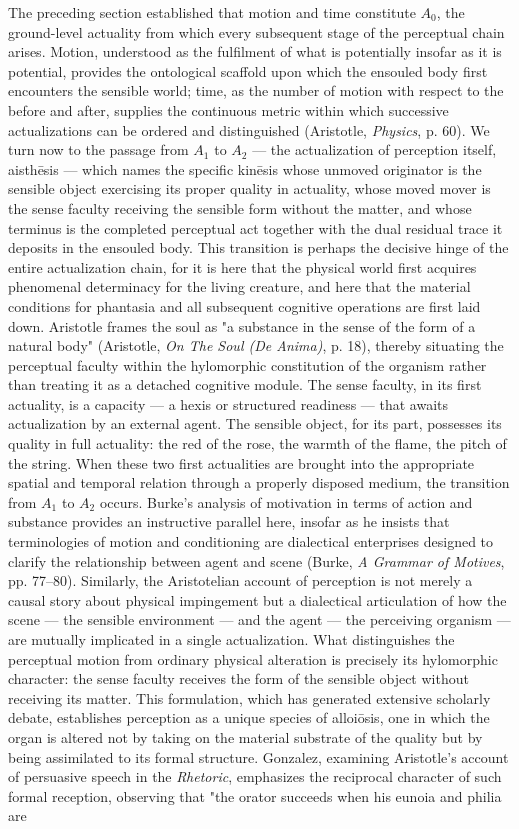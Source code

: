 The preceding section established that motion and time constitute $A_0$, the ground-level actuality from which every subsequent stage of the perceptual chain arises. Motion, understood as the fulfilment of what is potentially insofar as it is potential, provides the ontological scaffold upon which the ensouled body first encounters the sensible world; time, as the number of motion with respect to the before and after, supplies the continuous metric within which successive actualizations can be ordered and distinguished (Aristotle, \textit{Physics}, p. 60). We turn now to the passage from $A_1$ to $A_2$ --- the actualization of perception itself, aisthēsis --- which names the specific kinēsis whose unmoved originator is the sensible object exercising its proper quality in actuality, whose moved mover is the sense faculty receiving the sensible form without the matter, and whose terminus is the completed perceptual act together with the dual residual trace it deposits in the ensouled body. This transition is perhaps the decisive hinge of the entire actualization chain, for it is here that the physical world first acquires phenomenal determinacy for the living creature, and here that the material conditions for phantasia and all subsequent cognitive operations are first laid down. Aristotle frames the soul as "a substance in the sense of the form of a natural body" (Aristotle, \textit{On The Soul (De Anima)}, p. 18), thereby situating the perceptual faculty within the hylomorphic constitution of the organism rather than treating it as a detached cognitive module. The sense faculty, in its first actuality, is a capacity --- a hexis or structured readiness --- that awaits actualization by an external agent. The sensible object, for its part, possesses its quality in full actuality: the red of the rose, the warmth of the flame, the pitch of the string. When these two first actualities are brought into the appropriate spatial and temporal relation through a properly disposed medium, the transition from $A_1$ to $A_2$ occurs. Burke's analysis of motivation in terms of action and substance provides an instructive parallel here, insofar as he insists that terminologies of motion and conditioning are dialectical enterprises designed to clarify the relationship between agent and scene (Burke, \textit{A Grammar of Motives}, pp. 77--80). Similarly, the Aristotelian account of perception is not merely a causal story about physical impingement but a dialectical articulation of how the scene --- the sensible environment --- and the agent --- the perceiving organism --- are mutually implicated in a single actualization. What distinguishes the perceptual motion from ordinary physical alteration is precisely its hylomorphic character: the sense faculty receives the form of the sensible object without receiving its matter. This formulation, which has generated extensive scholarly debate, establishes perception as a unique species of alloiōsis, one in which the organ is altered not by taking on the material substrate of the quality but by being assimilated to its formal structure. Gonzalez, examining Aristotle's account of persuasive speech in the \textit{Rhetoric}, emphasizes the reciprocal character of such formal reception, observing that "the orator succeeds when his eunoia and philia are 